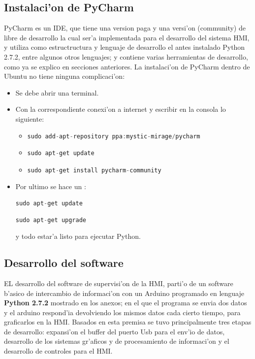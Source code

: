 \subsection{Instalaci'on de PyCharm}
PyCharm es un IDE, que tiene una version paga y una versi'on (community) de libre de desarrollo la cual ser'a implementada para el desarrollo del sistema HMI, y utiliza como estructructura y lenguaje de desarrollo el antes instalado Python 2.7.2, entre algunos otros lenguajes; y contiene varias herramientas de desarrollo, como ya se explico en secciones anteriores.
La instalaci'on de PyCharm dentro de Ubuntu no tiene ninguna complicaci'on:
\begin{itemize}
	\item Se debe abrir una terminal.
	\item Con la correspondiente conexi'on a internet y escribir en la consola lo siguiente:
	
	\begin{itemize}
		\item {\small
\begin{lstlisting}[language=C]
sudo add-apt-repository ppa:mystic-mirage/pycharm
\end{lstlisting}
}

		\item {\small
\begin{lstlisting}[language=C]
sudo apt-get update
\end{lstlisting}
}
		\item {\small
\begin{lstlisting}[language=C]
sudo apt-get install pycharm-community
\end{lstlisting}
}
	\end{itemize}
	\item Por ultimo se hace un : {\small\begin{lstlisting}[language=C]
	sudo apt-get update \end{lstlisting}}
	{\small\begin{lstlisting}[language=C]
	sudo apt-get upgrade \end{lstlisting}} y todo estar'a listo para ejecutar Python.
\end{itemize}



\subsection{Desarrollo del software}

EL desarrollo del software de supervisi'on de la HMI, parti'o de un software b'asico de intercambio de informaci'on con un Arduino programado en lenguaje \textbf{Python 2.7.2} mostrado en los anexos; en el que el programa se envia dos datos y el arduino respond'ia devolviendo los mismos datos cada cierto tiempo, para graficarlos en la HMI. Basados en esta premisa  se tuvo principalmente tres etapas de desarrollo: expansi'on el buffer del puerto Usb para el env'io de datos, desarrollo de los sistemas gr'aficos y de procesamiento de informaci'on y el desarrollo de controles para el HMI.

